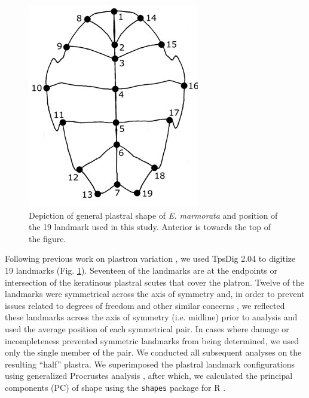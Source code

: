 \documentclass[12pt,letterpaper]{article}
\begin{document}
\begin{figure}[ht]
  \centering
  \includegraphics[height = 0.5\textheight, width = \textwidth, keepaspectratio = true]{figure/plastra}
  \caption{Depiction of general plastral shape of \textit{E. marmorata} and position of the 19 landmark used in this study. Anterior is towards the top of the figure.}
  \label{fig:plastra}
\end{figure}

Following previous work on plastron variation \citep{Angielczyk2007,Angielczyk2011,Angielczyk2013a}, we used TpsDig 2.04 \citep{Rohlf2005} to digitize 19 landmarks (Fig. \ref{fig:plastra}). Seventeen of the landmarks are at the endpoints or intersection of the keratinous plastral scutes that cover the platron. Twelve of the landmarks were symmetrical across the axis of symmetry and, in order to prevent issues related to degrees of freedom and other similar concerns \citep{Klingenberg2002}, we reflected these landmarks across the axis of symmetry (i.e. midline) prior to analysis and used the average position of each symmetrical pair. In cases where damage or incompleteness prevented symmetric landmarks from being determined, we used only the single member of the pair. We conducted all subsequent analyses on the resulting ``half'' plastra. We superimposed the plastral landmark configurations using generalized Procrustes analysis \citep{Dryden1998a}, after which, we calculated the principal components (PC) of shape using the \texttt{shapes} package for R \citep{2013,Dryden2013}.
\end{document}
